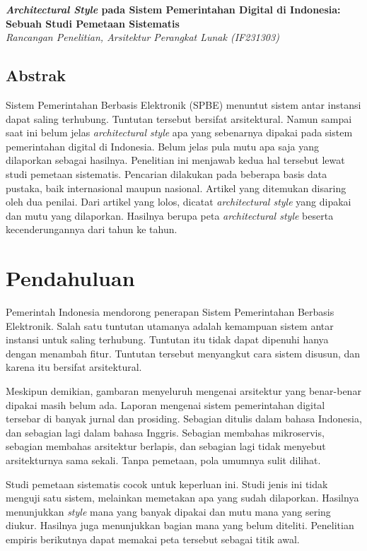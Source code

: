\documentclass[11pt,a4paper]{article}
\begin{document}
\begin{center}
  {\LARGE\bfseries \textit{Architectural Style} pada Sistem Pemerintahan Digital di Indonesia: Sebuah Studi Pemetaan Sistematis}\\[0.6em]
  {\small\itshape Rancangan Penelitian, Arsitektur Perangkat Lunak (IF231303)}
\end{center}

\vspace{1em}

\subsection*{Abstrak}

Sistem Pemerintahan Berbasis Elektronik (SPBE) menuntut sistem antar instansi dapat saling terhubung. Tuntutan tersebut bersifat arsitektural. Namun sampai saat ini belum jelas \textit{architectural style} apa yang sebenarnya dipakai pada sistem pemerintahan digital di Indonesia. Belum jelas pula mutu apa saja yang dilaporkan sebagai hasilnya. Penelitian ini menjawab kedua hal tersebut lewat studi pemetaan sistematis. Pencarian dilakukan pada beberapa basis data pustaka, baik internasional maupun nasional. Artikel yang ditemukan disaring oleh dua penilai. Dari artikel yang lolos, dicatat \textit{architectural style} yang dipakai dan mutu yang dilaporkan. Hasilnya berupa peta \textit{architectural style} beserta kecenderungannya dari tahun ke tahun.

\section{Pendahuluan}

Pemerintah Indonesia mendorong penerapan Sistem Pemerintahan Berbasis Elektronik. Salah satu tuntutan utamanya adalah kemampuan sistem antar instansi untuk saling terhubung. Tuntutan itu tidak dapat dipenuhi hanya dengan menambah fitur. Tuntutan tersebut menyangkut cara sistem disusun, dan karena itu bersifat arsitektural.

Meskipun demikian, gambaran menyeluruh mengenai arsitektur yang benar-benar dipakai masih belum ada. Laporan mengenai sistem pemerintahan digital tersebar di banyak jurnal dan prosiding. Sebagian ditulis dalam bahasa Indonesia, dan sebagian lagi dalam bahasa Inggris. Sebagian membahas mikroservis, sebagian membahas arsitektur berlapis, dan sebagian lagi tidak menyebut arsitekturnya sama sekali. Tanpa pemetaan, pola umumnya sulit dilihat.

Studi pemetaan sistematis cocok untuk keperluan ini. Studi jenis ini tidak menguji satu sistem, melainkan memetakan apa yang sudah dilaporkan. Hasilnya menunjukkan \textit{style} mana yang banyak dipakai dan mutu mana yang sering diukur. Hasilnya juga menunjukkan bagian mana yang belum diteliti. Penelitian empiris berikutnya dapat memakai peta tersebut sebagai titik awal.
\end{document}
